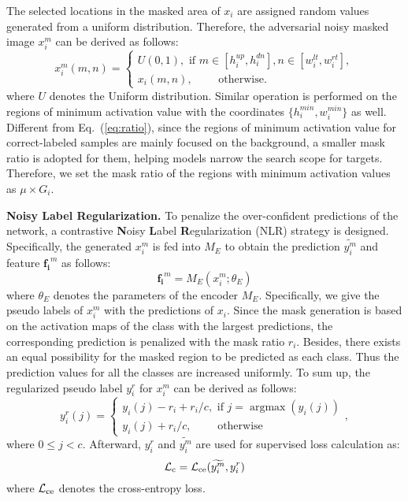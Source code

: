 \documentclass[10pt,twocolumn,letterpaper]{article}
\begin{document}
The selected locations in the masked area of $x_i$ are assigned random values generated from a uniform distribution. Therefore, the adversarial noisy masked image $x_i ^{m}$ can be derived as follows:
\begin{equation}
    x_{i}^{m}(m, n)=\left\{\begin{array}{l}
 {U}(0,1), \text { if } m \in\left[h_{i}^{up}, h_{i}^{dn }\right], n \in\left[w_{i}^{lt }, w_{i}^{rt}\right], \\
x_{i}(m, n), \quad \quad  \text { otherwise. }
\end{array}\right.
\end{equation}
where $U$ denotes the Uniform distribution. Similar operation is performed on the regions of minimum activation value with the coordinates $\{{h}_i ^{min}, {w}_i ^{min}\}$ as well. Different from Eq.~(\ref{eq:ratio}), since the regions of minimum activation value for correct-labeled samples are mainly focused on the background, a smaller mask ratio is adopted for them, helping models narrow the search scope for targets. Therefore, we set the mask ratio of the regions with minimum activation values as $\mu\times G_i$. 



\textbf{Noisy {Label} Regularization.} To penalize the {over-confident} predictions of the network, a contrastive \textbf{N}oisy \textbf{L}abel \textbf{R}egularization (NLR) strategy is designed. Specifically, the generated $x_i ^{m}$ is fed into $M_E$ to obtain the prediction $\widetilde{{y}_i ^m}$ and feature $\mathbf{f_i} ^{m}$ as follows:
\begin{equation}
{\mathbf{f_i} ^{m}}=M_E({x_i ^{m}};\theta_{E})
\label{eq:feature}
\end{equation}
where $\theta_{E}$ denotes the parameters of the encoder $M_E$. Specifically, we give the pseudo labels of $x_i ^{m}$ with the predictions of $x_i$. Since the mask generation is based on the activation maps of the class with the largest predictions, the corresponding prediction is penalized with the mask ratio $r_i$. Besides, there exists an equal possibility for the masked region to be predicted as each class. Thus the prediction values for all the classes are increased uniformly. To sum up, the regularized pseudo label ${{y}_i ^r}$ for $x_i ^m$ can be derived as follows:
{\begin{equation}
{{y}_{i} ^{r}}(j)=\left\{\begin{array}{l}
{y}_{i}(j)-r_{i}+r_{i} / c, \text { if } j=\operatorname{argmax}\left({y_{i}}(j)\right) \\
{y}_{i}(j)+r_{i} / c, \quad \quad  \text { otherwise }
\end{array},\right.
\end{equation}}where $0 \leq j <c$. Afterward, ${{y}_i ^r}$ and $\widetilde{{y}_i ^m}$ are used for supervised loss calculation as:
{\begin{equation}
   {\mathcal{L}_{\rm c}}={\mathcal{L}_{\rm ce}}({\widetilde{{y}_i ^m}},{{{y}_i ^r}})
\end{equation}}
where $\mathcal{L}_{\rm ce}$ denotes the cross-entropy loss.
\vspace{-2mm}
\end{document}
